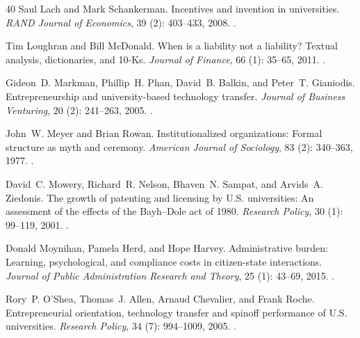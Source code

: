 \begin{thebibliography}{40}
Saul Lach and Mark Schankerman.
\newblock Incentives and invention in universities.
\newblock \emph{RAND Journal of Economics}, 39 (2): 403--433,
  2008.
\newblock {}.

Tim Loughran and Bill McDonald.
\newblock When is a liability not a liability? {Textual} analysis,
  dictionaries, and {10-Ks}.
\newblock \emph{Journal of Finance}, 66 (1): 35--65, 2011.
\newblock {}.

Gideon~D. Markman, Phillip~H. Phan, David~B. Balkin, and Peter~T. Gianiodis.
\newblock Entrepreneurship and university-based technology transfer.
\newblock \emph{Journal of Business Venturing}, 20 (2):
  241--263, 2005.
\newblock {}.

John~W. Meyer and Brian Rowan.
\newblock Institutionalized organizations: Formal structure as myth and
  ceremony.
\newblock \emph{American Journal of Sociology}, 83 (2):
  340--363, 1977.
\newblock {}.

David~C. Mowery, Richard~R. Nelson, Bhaven~N. Sampat, and Arvids~A. Ziedonis.
\newblock The growth of patenting and licensing by {U.S.} universities: An
  assessment of the effects of the {Bayh--Dole} act of 1980.
\newblock \emph{Research Policy}, 30 (1): 99--119, 2001.
\newblock {}.

Donald Moynihan, Pamela Herd, and Hope Harvey.
\newblock Administrative burden: Learning, psychological, and compliance costs
  in citizen-state interactions.
\newblock \emph{Journal of Public Administration Research and Theory},
  25 (1): 43--69, 2015.
\newblock {}.

Rory~P. O'Shea, Thomas~J. Allen, Arnaud Chevalier, and Frank Roche.
\newblock Entrepreneurial orientation, technology transfer and spinoff
  performance of {U.S.} universities.
\newblock \emph{Research Policy}, 34 (7): 994--1009, 2005.
\newblock {}.


\end{thebibliography}
